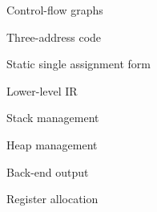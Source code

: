 \documentclass[../index.tex]{subfiles}
\begin{document}
\renewcommand{\currenttitle}{Control-flow graphs}
\begin{frame}[fragile]{\currenttitle}
\end{frame}
  
\renewcommand{\currenttitle}{Three-address code}
\begin{frame}[fragile]{\currenttitle}
\end{frame}
  
\renewcommand{\currenttitle}{Static single assignment form}
\begin{frame}[fragile]{\currenttitle}
\end{frame}

\renewcommand{\currenttitle}{Lower-level IR}
\begin{frame}[fragile]{\currenttitle}
\end{frame}

\renewcommand{\currenttitle}{Stack management}
\begin{frame}[fragile]{\currenttitle}
\end{frame}

\renewcommand{\currenttitle}{Heap management}
\begin{frame}[fragile]{\currenttitle}
\end{frame}

\renewcommand{\currenttitle}{Back-end output}
\begin{frame}[fragile]{\currenttitle}
\end{frame}

\renewcommand{\currenttitle}{Register allocation}
\begin{frame}[fragile]{\currenttitle}
\end{frame}

\end{document}

